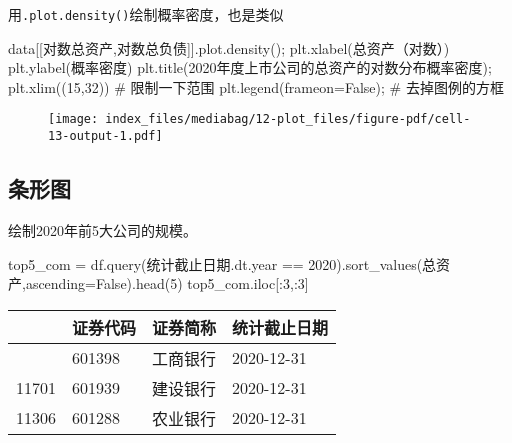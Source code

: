\documentclass[
  letterpaper,
  DIV=11,
  numbers=noendperiod]{scrreprt}
\newenvironment{Shaded}{\begin{snugshade}}{\end{snugshade}}
\newcommand{\CommentTok}[1]{\textcolor[rgb]{0.37,0.37,0.37}{#1}}
\newcommand{\DecValTok}[1]{\textcolor[rgb]{0.68,0.00,0.00}{#1}}
\newcommand{\NormalTok}[1]{\textcolor[rgb]{0.00,0.23,0.31}{#1}}
\newcommand{\OperatorTok}[1]{\textcolor[rgb]{0.37,0.37,0.37}{#1}}
\newcommand{\StringTok}[1]{\textcolor[rgb]{0.13,0.47,0.30}{#1}}
\newcommand{\VariableTok}[1]{\textcolor[rgb]{0.07,0.07,0.07}{#1}}
\begin{document}
用\texttt{.plot.density()}绘制概率密度，也是类似

\begin{Shaded}
\begin{Highlighting}[]
\NormalTok{data[[}\StringTok{\textquotesingle{}对数总资产\textquotesingle{}}\NormalTok{,}\StringTok{\textquotesingle{}对数总负债\textquotesingle{}}\NormalTok{]].plot.density()}\OperatorTok{;}
\NormalTok{plt.xlabel(}\StringTok{\textquotesingle{}总资产（对数）\textquotesingle{}}\NormalTok{)}
\NormalTok{plt.ylabel(}\StringTok{\textquotesingle{}概率密度\textquotesingle{}}\NormalTok{)}
\NormalTok{plt.title(}\StringTok{\textquotesingle{}2020年度上市公司的总资产的对数分布概率密度\textquotesingle{}}\NormalTok{)}\OperatorTok{;}
\NormalTok{plt.xlim((}\DecValTok{15}\NormalTok{,}\DecValTok{32}\NormalTok{)) }\CommentTok{\# 限制一下范围}
\NormalTok{plt.legend(frameon}\OperatorTok{=}\VariableTok{False}\NormalTok{)}\OperatorTok{;} \CommentTok{\# 去掉图例的方框}
\end{Highlighting}
\end{Shaded}

\begin{figure}[H]

{\centering \texttt{[image: index\_files/mediabag/12-plot\_files/figure-pdf/cell-13-output-1.pdf]}

}

\end{figure}

\hypertarget{ux6761ux5f62ux56fe}{%
\subsection{条形图}\label{ux6761ux5f62ux56fe}}

绘制2020年前5大公司的规模。

\begin{Shaded}
\begin{Highlighting}[]
\NormalTok{top5\_com }\OperatorTok{=}\NormalTok{ df.query(}\StringTok{\textquotesingle{}统计截止日期.dt.year == 2020\textquotesingle{}}\NormalTok{).sort\_values(}\StringTok{\textquotesingle{}总资产\textquotesingle{}}\NormalTok{,ascending}\OperatorTok{=}\VariableTok{False}\NormalTok{).head(}\DecValTok{5}\NormalTok{)}
\NormalTok{top5\_com.iloc[:}\DecValTok{3}\NormalTok{,:}\DecValTok{3}\NormalTok{]}
\end{Highlighting}
\end{Shaded}

\begin{longtable}[]{@{}llll@{}}
\toprule\noalign{}
& 证券代码 & 证券简称 & 统计截止日期 \\
\midrule\noalign{}
\endhead
\bottomrule\noalign{}
\endlastfoot
11384 & 601398 & 工商银行 & 2020-12-31 \\
11701 & 601939 & 建设银行 & 2020-12-31 \\
11306 & 601288 & 农业银行 & 2020-12-31 \\
\end{longtable}
\end{document}

